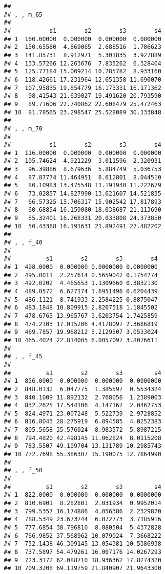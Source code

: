 \documentclass[
]{article}
\begin{document}
\begin{verbatim}
## 
## , , m_65
## 
##           s1        s2        s3        s4
## 1  160.00000  0.000000  0.000000  0.000000
## 2  150.65580  4.869065  2.688516  1.786623
## 3  141.85731  8.912971  5.301835  3.927889
## 4  133.57266 12.263676  7.835262  6.328404
## 5  125.77184 15.009214 10.285782  8.933160
## 6  118.42661 17.231964 12.651358 11.690070
## 7  107.95835 19.854779 16.173331 16.171362
## 8   98.41543 21.639027 19.491620 20.793590
## 9   89.71606 22.740862 22.608479 25.472463
## 10  81.78565 23.298547 25.528089 30.133848
## 
## , , m_70
## 
##           s1        s2        s3        s4
## 1  116.00000  0.000000  0.000000  0.000000
## 2  105.74624  4.921229  3.011596  2.320931
## 3   96.39886  8.679636  5.884749  5.036753
## 4   87.87774 11.464951  8.612801  8.044510
## 5   80.10983 13.475548 11.191940 11.222679
## 6   73.02857 14.827990 13.621607 14.521835
## 7   66.57325 15.706317 15.902542 17.817893
## 8   60.68854 16.159080 18.038687 21.113690
## 9   55.32401 16.268331 20.033808 24.373850
## 10  50.43368 16.191631 21.892491 27.482202
## 
## , , f_40
## 
##          s1        s2        s3        s4
## 1  498.0000  0.000000 0.0000000 0.0000000
## 2  495.0011  2.257614 0.5659042 0.1754274
## 3  492.0202  4.465653 1.1309660 0.3832130
## 4  489.0572  6.627174 1.6951496 0.6204439
## 5  486.1121  8.741933 2.2584225 0.8875047
## 6  483.1848 10.809915 2.8207518 1.1845502
## 7  478.6765 13.965767 3.6203754 1.7425859
## 8  474.2103 17.015206 4.4178097 2.3686819
## 9  469.7857 19.968212 5.2129507 3.0533024
## 10 465.4024 22.814005 6.0057097 3.8076611
## 
## , , f_45
## 
##          s1        s2        s3         s4
## 1  856.0000  0.000000  0.000000  0.0000000
## 2  848.0132  6.047775  1.385597  0.5534324
## 3  840.1009 11.892132  2.768056  1.2389003
## 4  832.2625 17.544106  4.147167  2.0462753
## 5  824.4971 23.007248  5.522739  2.9728852
## 6  816.8043 28.275919  6.894585  4.0252383
## 7  805.5658 35.576024  8.983572  5.8987215
## 8  794.4820 42.498145 11.062824  8.0115208
## 9  783.5507 49.109704 13.131789 10.2985743
## 10 772.7698 55.386307 15.190075 12.7864990
## 
## , , f_50
## 
##          s1        s2        s3         s4
## 1  822.0000  0.000000  0.000000  0.0000000
## 2  810.6901  8.282801  2.031934  0.9952014
## 3  799.5357 16.174886  4.056386  2.2329870
## 4  788.5349 23.673744  6.072773  3.7185916
## 5  777.6854 30.796810  8.080504  5.4372828
## 6  766.9852 37.568962 10.079024  7.3668222
## 7  752.1438 46.309145 13.054381 10.5386938
## 8  737.5897 54.479261 16.007176 14.0267293
## 9  723.3172 62.088710 18.936362 17.8274320
## 10 709.3208 69.119759 21.840907 21.9643300

\end{verbatim}
\end{document}
